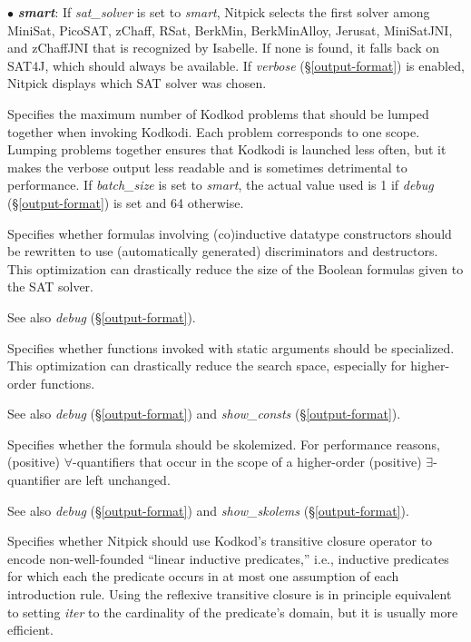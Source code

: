 \documentclass[a4paper,12pt]{article}
\begin{document}
\begin{enum}
\begin{enum}
\item[$\bullet$] \textbf{\textit{smart}}: If \textit{sat\_solver} is set to
\textit{smart}, Nitpick selects the first solver among MiniSat,
PicoSAT, zChaff, RSat, BerkMin, BerkMinAlloy, Jerusat, MiniSatJNI, and zChaffJNI
that is recognized by Isabelle. If none is found, it falls back on SAT4J, which
should always be available. If \textit{verbose} (\S\ref{output-format}) is
enabled, Nitpick displays which SAT solver was chosen.
\end{enum}
\fussy

Specifies the maximum number of Kodkod problems that should be lumped together
when invoking Kodkodi. Each problem corresponds to one scope. Lumping problems
together ensures that Kodkodi is launched less often, but it makes the verbose
output less readable and is sometimes detrimental to performance. If
\textit{batch\_size} is set to \textit{smart}, the actual value used is 1 if
\textit{debug} (\S\ref{output-format}) is set and 64 otherwise.

Specifies whether formulas involving (co)in\-duc\-tive datatype constructors should
be rewritten to use (automatically generated) discriminators and destructors.
This optimization can drastically reduce the size of the Boolean formulas given
to the SAT solver.

\nopagebreak
{\small See also \textit{debug} (\S\ref{output-format}).}

Specifies whether functions invoked with static arguments should be specialized.
This optimization can drastically reduce the search space, especially for
higher-order functions.

\nopagebreak
{\small See also \textit{debug} (\S\ref{output-format}) and
\textit{show\_consts} (\S\ref{output-format}).}

Specifies whether the formula should be skolemized. For performance reasons,
(positive) $\forall$-quanti\-fiers that occur in the scope of a higher-order
(positive) $\exists$-quanti\-fier are left unchanged.

\nopagebreak
{\small See also \textit{debug} (\S\ref{output-format}) and
\textit{show\_skolems} (\S\ref{output-format}).}

Specifies whether Nitpick should use Kodkod's transitive closure operator to
encode non-well-founded ``linear inductive predicates,'' i.e., inductive
predicates for which each the predicate occurs in at most one assumption of each
introduction rule. Using the reflexive transitive closure is in principle
equivalent to setting \textit{iter} to the cardinality of the predicate's
domain, but it is usually more efficient.


\end{enum}
\end{document}
